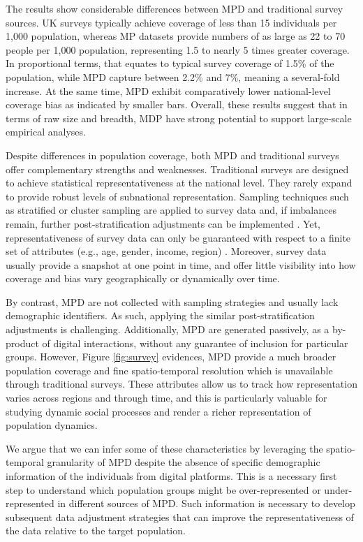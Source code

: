\documentclass[]{rsos}%
\begin{document}
The results show considerable differences between MPD and
traditional survey sources. UK surveys typically achieve coverage of
less than 15 individuals per 1,000 population, whereas MP datasets provide numbers of as large as 22 to 70 people per 1,000 population, representing 1.5 to nearly 5 times greater coverage. In proportional terms, that equates to typical survey coverage of 1.5\% of the population, while MPD capture between 2.2\% and 7\%, meaning a several-fold increase. At the same time, MPD exhibit comparatively lower national-level coverage bias as indicated by smaller bars. Overall, these results suggest that in
terms of raw size and breadth, MDP have strong potential
to support large-scale empirical analyses.

Despite differences in population coverage, both MPD and
traditional surveys offer complementary strengths and weaknesses.
Traditional surveys are designed to achieve statistical
representativeness at the national level. They rarely expand to provide robust levels of subnational representation. Sampling techniques
such as stratified or cluster sampling are applied to survey data and, if imbalances
remain, further post-stratification adjustments can be implemented
\citep{lohr2021}. Yet, representativeness of survey data can only be guaranteed with
respect to a finite set of attributes (e.g., age, gender, income,
region) \citep{cochran1977sampling}. Moreover, survey data usually provide a
snapshot at one point in time, and offer little visibility into how
coverage and bias vary geographically or dynamically over time.

By contrast, MPD are not collected with sampling strategies and
usually lack demographic identifiers. As such, applying the similar
post-stratification adjustments is challenging. Additionally, MPD are generated passively, as a by-product of digital interactions, without any guarantee of inclusion
for particular groups. However, Figure \ref{fig:survey} evidences, MPD provide a much broader population coverage and fine spatio-temporal resolution which is unavailable through traditional surveys. These attributes allow us to track how representation varies across regions and through time, and
this is particularly valuable for studying dynamic social processes and render a richer representation of population dynamics.

We argue that we
can infer some of these characteristics by leveraging the
spatio-temporal granularity of MPD despite the absence of specific demographic
information of the individuals from digital platforms. This is a necessary first step
to understand which population groups might be over-represented or
under-represented in different sources of MPD. Such information is
necessary to develop subsequent data adjustment strategies that can
improve the representativeness of the data relative to the target
population.
\end{document}
